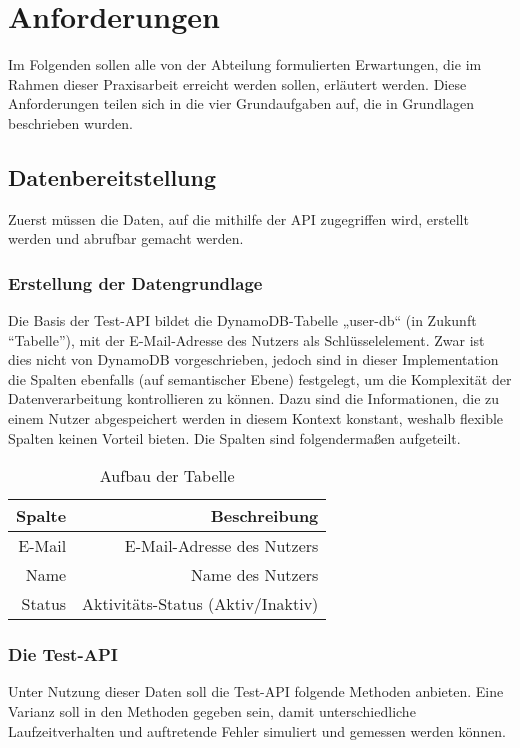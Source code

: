 \section{Anforderungen}
Im Folgenden sollen alle von der Abteilung formulierten Erwartungen, die im Rahmen dieser Praxisarbeit erreicht werden sollen, erläutert werden. Diese Anforderungen teilen sich in die vier Grundaufgaben auf, die in Grundlagen beschrieben wurden.
\subsection{Datenbereitstellung}
Zuerst müssen die Daten, auf die mithilfe der API zugegriffen wird, erstellt werden und abrufbar gemacht werden.
\subsubsection{Erstellung der Datengrundlage}
Die Basis der Test-API bildet die DynamoDB-Tabelle „user-db“ (in Zukunft ``Tabelle''), mit der E-Mail-Adresse des Nutzers als Schlüsselelement. Zwar ist dies nicht von DynamoDB vorgeschrieben, jedoch sind in dieser Implementation die Spalten ebenfalls (auf semantischer Ebene) festgelegt, um die Komplexität der Datenverarbeitung kontrollieren zu können.  Dazu sind die Informationen, die zu einem Nutzer abgespeichert werden in diesem Kontext konstant, weshalb flexible Spalten keinen Vorteil bieten. \newpage 
Die Spalten sind folgendermaßen aufgeteilt.

\begin{table}[hbt]
\centering
\begin{minipage}[t]{.5\textwidth} %
\caption{Aufbau der Tabelle} %
\begin{tabularx}{\columnwidth}{rr}
\toprule
Spalte & Beschreibung\\
\midrule
E-Mail & E-Mail-Adresse des Nutzers\\
Name   & Name des Nutzers\\
Status & Aktivitäts-Status (Aktiv/Inaktiv)\\
\bottomrule
\end{tabularx}
\label{tab:schema}
\end{minipage}
\end{table}
\subsubsection{Die Test-API}
Unter Nutzung dieser Daten soll die Test-API folgende Methoden anbieten. Eine Varianz soll in den Methoden gegeben sein, damit unterschiedliche Laufzeitverhalten und auftretende Fehler simuliert und gemessen werden können.
